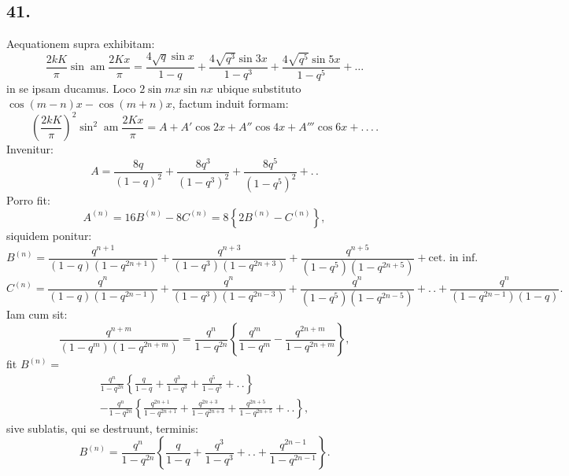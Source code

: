 \documentclass{article}
\begin{document}
\subsection*{41.}

Aequationem supra exhibitam:
\[
\frac{2kK}{\pi}\sin\operatorname{am}\frac{2Kx}{\pi}=\frac{4\sqrt{q}\sin x}{1-q}+\frac{4\sqrt{q^{3}}\sin 3x}{1-q^{3}}+\frac{4\sqrt{q^{5}}\sin 5x}{1-q^{5}}+\ldots
\]
in se ipsam ducamus. Loco $2\sin mx\sin nx$ ubique substituto $\cos(m-n)x-\cos(m+n)x$, factum induit formam:
\[
\left(\frac{2kK}{\pi}\right)^{2}\sin^{2}\operatorname{am}\frac{2Kx}{\pi}=A+A'\cos 2x+A''\cos 4x+A'''\cos 6x+.\,.\,.\,.
\]
Invenitur:
\[
A=\frac{8q}{(1-q)^{2}}+\frac{8q^{3}}{(1-q^{3})^{2}}+\frac{8q^{5}}{(1-q^{5})^{2}}+.\,.
\]
Porro fit:
\[
A^{(n)}=16B^{(n)}-8C^{(n)}=8\left\{2B^{(n)}-C^{(n)}\right\},
\]
siquidem ponitur:
\[
B^{(n)}=\frac{q^{n+1}}{(1-q)(1-q^{2n+1})}+\frac{q^{n+3}}{(1-q^{3})(1-q^{2n+3})}+\frac{q^{n+5}}{(1-q^{5})(1-q^{2n+5})}+\text{cet.\ in inf.}
\]
\[
C^{(n)}=\frac{q^{n}}{(1-q)(1-q^{2n-1})}+\frac{q^{n}}{(1-q^{3})(1-q^{2n-3})}+\frac{q^{n}}{(1-q^{5})(1-q^{2n-5})}+.\,.+\frac{q^{n}}{(1-q^{2n-1})(1-q)}.
\]
Iam cum sit:
\[
\frac{q^{n+m}}{(1-q^{m})(1-q^{2n+m})}=\frac{q^{n}}{1-q^{2n}}\left\{\frac{q^{m}}{1-q^{m}}-\frac{q^{2n+m}}{1-q^{2n+m}}\right\},
\]
fit $B^{(n)}=$
\[
\begin{gathered}
\frac{q^{n}}{1-q^{2n}}\left\{\frac{q}{1-q}+\frac{q^{3}}{1-q^{3}}+\frac{q^{5}}{1-q^{5}}+.\,.\right\}\\[1.5ex]
-\frac{q^{n}}{1-q^{2n}}\left\{\frac{q^{2n+1}}{1-q^{2n+1}}+\frac{q^{2n+3}}{1-q^{2n+3}}+\frac{q^{2n+5}}{1-q^{2n+5}}+.\,.\right\},
\end{gathered}
\]
sive sublatis, qui se destruunt, terminis:
\[
B^{(n)}=\frac{q^{n}}{1-q^{2n}}\left\{\frac{q}{1-q}+\frac{q^{3}}{1-q^{3}}+.\,.+\frac{q^{2n-1}}{1-q^{2n-1}}\right\}.
\]
\end{document}

